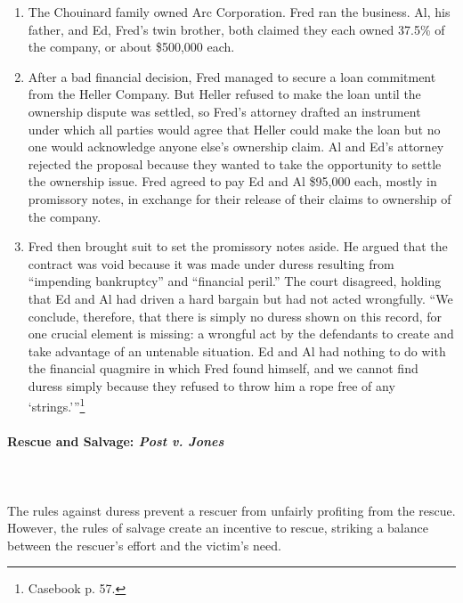 \begin{enumerate}
    \item The Chouinard family owned Arc Corporation. Fred ran the business. 
    Al, his father, and Ed, Fred's twin brother, both claimed they each owned 
    37.5\% of the company, or about \$500,000 each.
    \item After a bad financial decision, Fred managed to secure a loan 
    commitment from the Heller Company. But Heller refused to make the loan 
    until the ownership dispute was settled, so Fred's attorney drafted an 
    instrument under which all parties would agree that Heller could make the 
    loan but no one would acknowledge anyone else's ownership claim. Al and 
    Ed's attorney rejected the proposal because they wanted to take the 
    opportunity to settle the ownership issue. Fred agreed to pay Ed and Al 
    \$95,000 each, mostly in promissory notes, in exchange for their release 
    of their claims to ownership of the company.
    \item Fred then brought suit to set the promissory notes aside. He argued 
    that the contract was void because it was made under duress resulting from 
    ``impending bankruptcy'' and ``financial peril.'' The court disagreed, 
    holding that Ed and Al had driven a hard bargain but had not acted 
    wrongfully. \enquote{We conclude, therefore, that there is simply no 
    duress shown on this record, for one crucial element is missing: a 
    wrongful act by the defendants to create and take advantage of an 
    untenable situation. Ed and Al had nothing to do with the financial 
    quagmire in which Fred found himself, and we cannot find duress simply 
    because they refused to throw him a rope free of any 
    \enquote{strings.}}\footnote{Casebook p. 57.}
\end{enumerate}

\paragraph{Rescue and Salvage: \emph{Post v. Jones}}
~\\\\
The rules against duress prevent a rescuer from unfairly profiting from the 
rescue. However, the rules of salvage create an incentive to rescue, striking 
a balance between the rescuer's effort and the victim's need.

